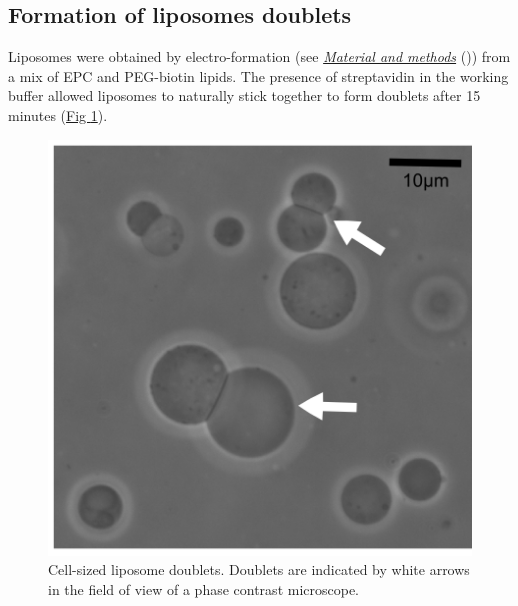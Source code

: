 \documentclass[A4paperpaper,11pt,english]{sphinxmanual}
\begin{document}
\subsection{Formation of liposomes doublets}
\label{index-latex:formation-of-liposomes-doublets}
Liposomes were obtained by electro-formation (see {\hyperref[index-latex:electroformation]{\emph{Material and methods}}} ()) from a mix of EPC and PEG-biotin lipids. The presence of
streptavidin in the working buffer allowed liposomes to naturally stick together
to form doublets after 15 minutes (\hyperref[index-latex:fig1a]{Fig  \ref*{index-latex:fig1a}}).
\begin{figure}[htbp]
\centering
\capstart

\includegraphics[width=0.500\linewidth]{Fig_01-A.png}
\caption{Cell-sized liposome doublets. Doublets are indicated by white arrows in
the field of view of a phase contrast microscope.}\label{index-latex:fig1a}\end{figure}
\end{document}
